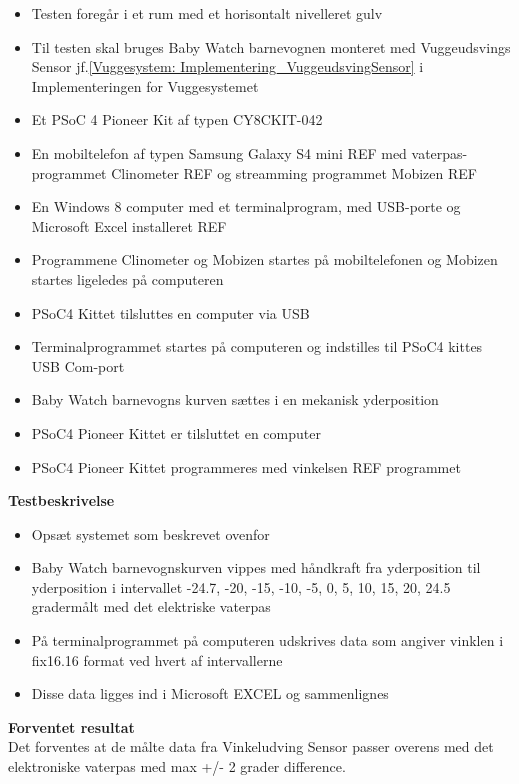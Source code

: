 \begin{itemize}
	\item Testen foregår i et rum med et horisontalt nivelleret gulv
	\item Til testen skal bruges Baby Watch barnevognen monteret med Vuggeudsvings Sensor jf.\vref{Vuggesystem: Implementering_VuggeudsvingSensor} i Implementeringen for Vuggesystemet
	\item Et PSoC 4 Pioneer Kit af typen CY8CKIT-042 
	\item En mobiltelefon af typen Samsung Galaxy S4 mini REF med vaterpas-programmet Clinometer REF og streamming programmet Mobizen REF
	\item En Windows 8 computer med et terminalprogram, med USB-porte og Microsoft Excel installeret REF
	\item Programmene Clinometer og Mobizen startes på mobiltelefonen og Mobizen startes ligeledes på computeren
	\item PSoC4 Kittet tilsluttes en computer via USB
	\item Terminalprogrammet startes på computeren og indstilles til PSoC4 kittes USB Com-port
	\item Baby Watch barnevogns kurven sættes i en mekanisk yderposition
	\item PSoC4 Pioneer Kittet er tilsluttet en computer
	\item PSoC4 Pioneer Kittet programmeres med vinkelsen REF programmet
\end{itemize}

\textbf{Testbeskrivelse}
\begin{itemize}
\item Opsæt systemet som beskrevet ovenfor
\item Baby Watch barnevognskurven vippes med håndkraft fra yderposition til yderposition i intervallet -24.7, -20, -15, -10, -5, 0, 5, 10, 15, 20, 24.5 grader\footnotemark målt med det elektriske vaterpas 
\item På terminalprogrammet på computeren udskrives data som angiver vinklen i fix16.16 format ved hvert af intervallerne
\item Disse data ligges ind i Microsoft EXCEL og sammenlignes
\end{itemize}

\textbf{Forventet resultat} \\
Det forventes at de målte data fra Vinkeludving Sensor passer overens med det elektroniske vaterpas med max +/- 2 grader difference.
 \\

